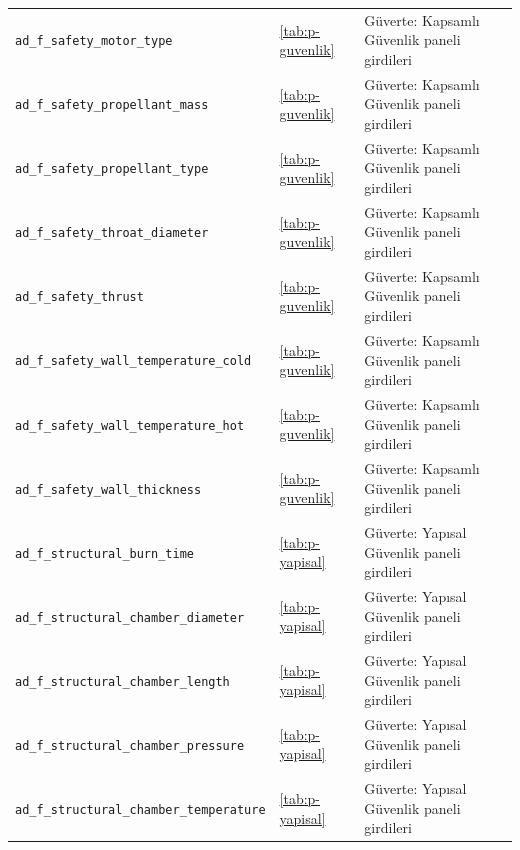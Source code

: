 \documentclass[11pt,a4paper]{article}
\begin{document}
{\begin{longtable}{@{}>{\raggedright\arraybackslash}p{5.2cm}p{1.4cm}>{\raggedright\arraybackslash}p{7.4cm}@{}}
\texttt{ad\_\allowbreak{}f\_\allowbreak{}safety\_\allowbreak{}motor\_\allowbreak{}type} & \ref{tab:p-guvenlik} & Güverte: Kapsamlı Güvenlik paneli girdileri \\
\texttt{ad\_\allowbreak{}f\_\allowbreak{}safety\_\allowbreak{}propellant\_\allowbreak{}mass} & \ref{tab:p-guvenlik} & Güverte: Kapsamlı Güvenlik paneli girdileri \\
\texttt{ad\_\allowbreak{}f\_\allowbreak{}safety\_\allowbreak{}propellant\_\allowbreak{}type} & \ref{tab:p-guvenlik} & Güverte: Kapsamlı Güvenlik paneli girdileri \\
\texttt{ad\_\allowbreak{}f\_\allowbreak{}safety\_\allowbreak{}throat\_\allowbreak{}diameter} & \ref{tab:p-guvenlik} & Güverte: Kapsamlı Güvenlik paneli girdileri \\
\texttt{ad\_\allowbreak{}f\_\allowbreak{}safety\_\allowbreak{}thrust} & \ref{tab:p-guvenlik} & Güverte: Kapsamlı Güvenlik paneli girdileri \\
\texttt{ad\_\allowbreak{}f\_\allowbreak{}safety\_\allowbreak{}wall\_\allowbreak{}temperature\_\allowbreak{}cold} & \ref{tab:p-guvenlik} & Güverte: Kapsamlı Güvenlik paneli girdileri \\
\texttt{ad\_\allowbreak{}f\_\allowbreak{}safety\_\allowbreak{}wall\_\allowbreak{}temperature\_\allowbreak{}hot} & \ref{tab:p-guvenlik} & Güverte: Kapsamlı Güvenlik paneli girdileri \\
\texttt{ad\_\allowbreak{}f\_\allowbreak{}safety\_\allowbreak{}wall\_\allowbreak{}thickness} & \ref{tab:p-guvenlik} & Güverte: Kapsamlı Güvenlik paneli girdileri \\
\texttt{ad\_\allowbreak{}f\_\allowbreak{}structural\_\allowbreak{}burn\_\allowbreak{}time} & \ref{tab:p-yapisal} & Güverte: Yapısal Güvenlik paneli girdileri \\
\texttt{ad\_\allowbreak{}f\_\allowbreak{}structural\_\allowbreak{}chamber\_\allowbreak{}diameter} & \ref{tab:p-yapisal} & Güverte: Yapısal Güvenlik paneli girdileri \\
\texttt{ad\_\allowbreak{}f\_\allowbreak{}structural\_\allowbreak{}chamber\_\allowbreak{}length} & \ref{tab:p-yapisal} & Güverte: Yapısal Güvenlik paneli girdileri \\
\texttt{ad\_\allowbreak{}f\_\allowbreak{}structural\_\allowbreak{}chamber\_\allowbreak{}pressure} & \ref{tab:p-yapisal} & Güverte: Yapısal Güvenlik paneli girdileri \\
\texttt{ad\_\allowbreak{}f\_\allowbreak{}structural\_\allowbreak{}chamber\_\allowbreak{}temperature} & \ref{tab:p-yapisal} & Güverte: Yapısal Güvenlik paneli girdileri \\

\end{longtable}}
\end{document}
